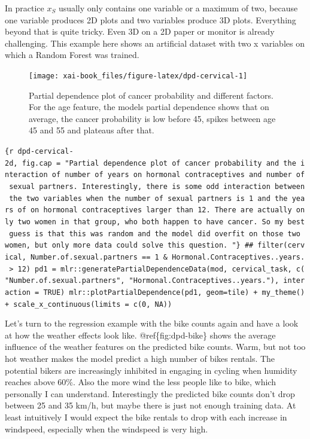 \documentclass[12pt,]{krantz}
\theoremstyle{definition}
\theoremstyle{definition}
\theoremstyle{definition}
\theoremstyle{remark}
\begin{document}
In practice \(x_S\) usually only contains one variable or a maximum of
two, because one variable produces 2D plots and two variables produce 3D
plots. Everything beyond that is quite tricky. Even 3D on a 2D paper or
monitor is already challenging. This example here shows an artificial
dataset with two x variables on which a Random Forest was trained.

\begin{figure}

{\centering \texttt{[image: xai-book\_files/figure-latex/dpd-cervical-1]} 

}

\caption{Partial dependence plot of cancer probability and different factors. For the age feature, the models partial dependence shows that on average, the cancer probability is low before 45, spikes between age 45 and 55 and plateaus after that.}\label{fig:dpd-cervical}
\end{figure}

\texttt{\{r\ dpd-cervical-2d,\ fig.cap\ =\ "Partial\ dependence\ plot\ of\ cancer\ probability\ and\ the\ interaction\ of\ number\ of\ years\ on\ hormonal\ contraceptives\ and\ number\ of\ sexual\ partners.\ Interestingly,\ there\ is\ some\ odd\ interaction\ between\ the\ two\ variables\ when\ the\ number\ of\ sexual\ partners\ is\ 1\ and\ the\ years\ of\ on\ hormonal\ contraceptives\ larger\ than\ 12.\ There\ are\ actually\ only\ two\ women\ in\ that\ group,\ who\ both\ happen\ to\ have\ cancer.\ So\ my\ best\ guess\ is\ that\ this\ was\ random\ and\ the\ model\ did\ overfit\ on\ those\ two\ women,\ but\ only\ more\ data\ could\ solve\ this\ question.\ "\}\ \#\#\ filter(cervical,\ Number.of.sexual.partners\ ==\ 1\ \&\ Hormonal.Contraceptives..years.\ \textgreater{}\ 12)\ pd1\ =\ mlr::generatePartialDependenceData(mod,\ cervical\_task,\ c("Number.of.sexual.partners",\ "Hormonal.Contraceptives..years."),\ interaction\ =\ TRUE)\ mlr::plotPartialDependence(pd1,\ geom=\textquotesingle{}tile\textquotesingle{})\ +\ my\_theme()+\ scale\_x\_continuous(limits\ =\ c(0,\ NA))}

Let's turn to the regression example with the bike counts again and have
a look at how the weather effects look like. @ref\{fig:dpd-bike\} shows
the average influence of the weather features on the predicted bike
counts. Warm, but not too hot weather makes the model predict a high
number of bikes rentals. The potential bikers are increasingly inhibited
in engaging in cycling when humidity reaches above 60\%. Also the more
wind the less people like to bike, which personally I can understand.
Interestingly the predicted bike counts don't drop between 25 and 35
km/h, but maybe there is just not enough training data. At least
intuitively I would expect the bike rentals to drop with each increase
in windspeed, especially when the windspeed is very high.
\end{document}
